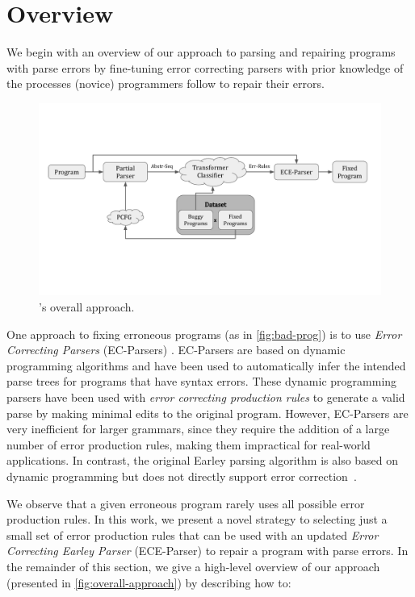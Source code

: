 \section{Overview}
\label{sec:overview}

We begin with an overview of our approach to parsing and repairing programs with
parse errors by fine-tuning error correcting parsers with prior knowledge of the
processes (novice) programmers follow to repair their errors.

\begin{figure}[t]
  \centering
  \includegraphics[trim={0 3.8cm 0 3.8cm}, clip, width=0.9\linewidth]{overall-approach.pdf}
  \caption{\toolname's overall approach.}
  \label{fig:overall-approach}
\end{figure}

One approach to fixing erroneous programs (as in \autoref{fig:bad-prog})
is to use \emph{Error Correcting Parsers} (EC-Parsers) \citep{Aho_1972}.
EC-Parsers are based on dynamic programming algorithms and have been used
to automatically infer the intended parse trees for programs
that have syntax errors. These dynamic programming parsers have been used
with \emph{error correcting production rules} \citep{Aho_1972} to
generate a valid parse by making minimal edits to the original program.
However, EC-Parsers are very inefficient for larger
grammars, since they require the addition of a large number of error production
rules, making them impractical for real-world applications. In contrast, the
original Earley parsing algorithm is also based on dynamic programming
but does not directly support error correction~\citep{Earley_1970}.

We observe that a given erroneous program rarely uses all possible error
production rules. In this work, we present a novel strategy to selecting just a
small set of error production rules that can be used with an updated \emph{Error
Correcting Earley Parser} (ECE-Parser) to repair a program with parse errors. In
the remainder of this section, we give a high-level overview of our approach
(presented in \autoref{fig:overall-approach}) by describing how to:

